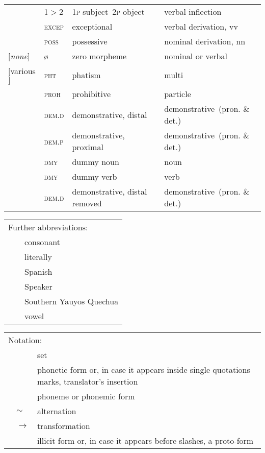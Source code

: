 \begin{refsection}
\begin{small}
\begin{longtable}{*{4}{@{\hspace{0.75ex}}l}@{\hspace{0ex}}}
 	& 1$>$2 		& 1\textsc{p} subject~2\textsc{p} object 	& verbal inflection\\
 		& \textsc{excep} 	& exceptional 	& verbal derivation, vv\\
 		& \textsc{poss} 	& possessive 	& nominal derivation, nn\\
$[$\textit{none}$]$ 		& \o 			& zero morpheme 	& nominal or verbal\\
$[$various$]$ 		& \textsc{pht} 		& phatism 	& multi\\
 		& \textsc{proh} 	& prohibitive 	& particle\\
 		& \textsc{dem.d} 	& demonstrative, distal 	& demonstrative~(pron. \&{} det.)\\
		& \textsc{dem.p} 	& demonstrative, proximal 	& demonstrative~(pron. \&{} det.) \\
		& \textsc{dmy} 	& dummy noun 	& noun\\
		& \textsc{dmy} 	& dummy verb 	& verb\\
		& \textsc{dem.d} 	& demonstrative, distal removed 	& demonstrative~(pron. \&{} det.)\\
\end{longtable}
\end{small}

\begin{small}
\begin{tabular}{p{\parindent}lp{}}
\multicolumn{3}{l}{Further abbreviations:}\\[1ex]
&\Cons{}	&consonant		\\
&\lit{} 	&literally		\\
&\Sp{}	&Spanish		\\
&\spkr{}	&Speaker		\\
&\SYQ{} 	&Southern Yauyos Quechua\\
&\Vowe{}	&vowel			\\
\end{tabular}
\end{small}

\begin{small}
\begin{tabular}{p{\parindent}lp{}}
\multicolumn{3}{l}{Notation:}\\[1ex]
&\textipa{\{\textperiodcentered\}} 	& set\\
&\textipa{[{\textperiodcentered}]}	& phonetic form or, in case it appears inside single quotations marks, translator's insertion\\
&\textipa{/\textperiodcentered/}	& phoneme or phonemic form\\
&$\sim$ 				& alternation\\
&$\rightarrow $			& transformation\\
&\textipa{*}			& illicit form or, in case it appears before slashes, a proto-form\\
\end{tabular}
\end{small}
\printbibliography[heading=subbibliography]
\end{refsection}
